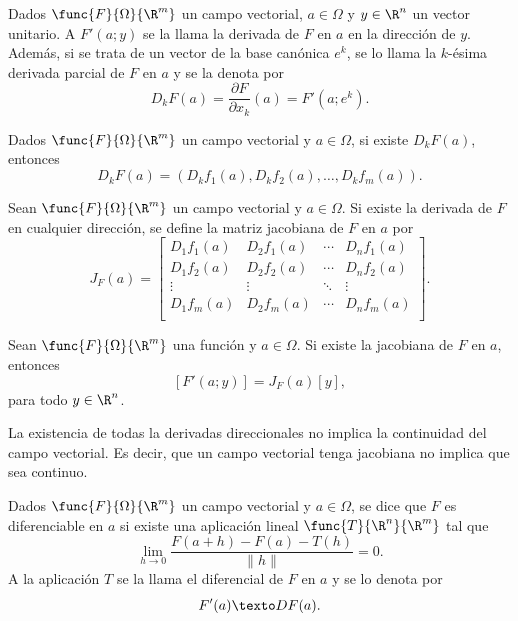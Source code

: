 \documentclass[a4,11pt]{aleph-notas}
\begin{document}
\begin{defi}
    Dados $\func{F}{\Omega}{\R^m}$ un campo vectorial, $a\in \Omega$ y $y\in \R^n$ un vector unitario. A $F'(a;y)$ se la llama la derivada de $F$ en $a$ en la dirección de $y$. Además, si se trata de un vector de la base canónica $e^k$, se lo llama la $k$-ésima derivada parcial de $F$ en $a$ y se la denota por 
    \[
        D_k F(a)=\frac{\partial F}{\partial x_k}(a)=F'(a;e^k).
    \]
\end{defi}

\begin{prop}
    Dados $\func{F}{\Omega}{\R^m}$ un campo vectorial y $a\in \Omega$, si existe $D_k F(a)$, entonces
    \[
        D_k F(a) = (D_k f_1(a), D_k f_2(a), \ldots, D_k f_m(a)).
    \]
\end{prop}

\begin{defi}
    Sean $\func{F}{\Omega}{\R^m}$ un campo vectorial y $a\in \Omega$. Si existe la derivada de $F$ en cualquier dirección, se define la matriz jacobiana de $F$ en $a$ por
    \[
        J_F(a) = 
        \begin{bmatrix}
         D_1f_1(a) & D_2f_1(a) & \cdots & D_nf_1(a) \\
         D_1f_2(a) & D_2f_2(a) & \cdots & D_nf_2(a) \\
         \vdots & \vdots &  \ddots & \vdots\\
         D_1f_m(a) & D_2f_m(a) & \cdots & D_nf_m(a) \\
        \end{bmatrix}.
    \]
\end{defi}

\begin{prop}
    Sean $\func{F}{\Omega}{\R^m}$ una función y $a\in \Omega$. Si existe la jacobiana de $F$ en $a$, entonces
    \[
        [F'(a;y)]= J_F(a) [y],
    \]
    para todo $y\in\R^n$.
\end{prop}

\begin{advertencia}
    La existencia de todas la derivadas direccionales no implica la continuidad del campo vectorial. Es decir, que un campo vectorial tenga jacobiana no implica que sea continuo.
\end{advertencia}

\begin{defi}
    Dados $\func{F}{\Omega}{\R^m}$ un campo vectorial y $a\in \Omega$, se dice que $F$ es diferenciable en $a$ si existe una aplicación lineal $\func{T}{\R^n}{\R^m}$ tal que
    \[
        \lim_{h\to 0}\frac{F(a+h)-F(a)-T(h)}{\|h\|}=0.
    \]
    A la aplicación $T$ se la llama el diferencial de $F$ en $a$ y se lo denota por
    \[
        F'(a)
        \texto
        DF(a).
    \]
\end{defi}
\end{document}
